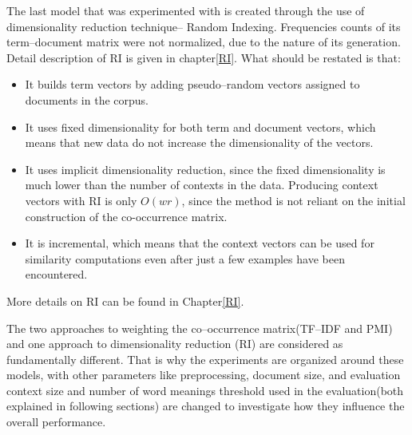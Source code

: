 The last model that was experimented with is created through the use of dimensionality reduction 
technique-- Random Indexing. Frequencies counts of its term--document matrix were not normalized, 
due to the nature of its generation. Detail description of RI is given in chapter\ref{RI}. What should be 
restated is that:
\begin{itemize}
\item It builds term vectors by adding pseudo--random vectors assigned to documents in the corpus.
\item It uses fixed dimensionality for both term and document vectors, which means that new data do not 
increase the dimensionality of the vectors.
\item It uses implicit dimensionality reduction, since the fixed dimensionality is
much lower than the number of contexts in the data. Producing
context vectors with RI is only $O(wr)$, since the method is not reliant on the
initial construction of the co-occurrence matrix.
\item It is incremental, which means that the context vectors can be used for similarity
computations even after just a few examples have been encountered.
\end{itemize}
More details on RI can be found in Chapter\ref{RI}. 

The two approaches to weighting the co--occurrence matrix(TF--IDF and PMI) and one approach to 
dimensionality reduction (RI) are considered as fundamentally different. That is why the experiments are organized around these models, with other 
parameters like preprocessing, document size, and evaluation context size and number of word 
meanings threshold used in the evaluation(both explained in following sections) are changed to investigate how they influence the overall performance. 

